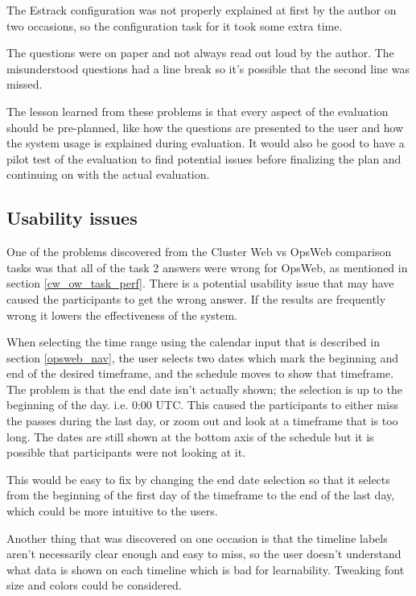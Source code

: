 The Estrack configuration was not properly explained at first by the author on two occasions, so the configuration task for it took some extra time.

The questions were on paper and not always read out loud by the author. The misunderstood questions had a line break so it's possible that the second line was missed. 

The lesson learned from these problems is that every aspect of the evaluation should be pre-planned, like how the questions are presented to the user and how the system usage is explained during evaluation. It would also be good to have a pilot test of the evaluation to find potential issues before finalizing the plan and continuing on with the actual evaluation.

\subsection{Usability issues} \label{usability_issues}
One of the problems discovered from the Cluster Web vs OpsWeb comparison tasks was that all of the task 2 answers were wrong for OpsWeb, as mentioned in section \ref{cw_ow_task_perf}. There is a potential usability issue that may have caused the participants to get the wrong answer. If the results are frequently wrong it lowers the effectiveness of the system.

When selecting the time range using the calendar input that is described in section \ref{opsweb_nav}, the user selects two dates which mark the beginning and end of the desired timeframe, and the schedule moves to show that timeframe. The problem is that the end date isn't actually shown; the selection is up to the beginning of the day. i.e. 0:00 UTC. This caused the participants to either miss the passes during the last day, or zoom out and look at a timeframe that is too long. The dates are still shown at the bottom axis of the schedule but it is possible that participants were not looking at it.

This would be easy to fix by changing the end date selection so that it selects from the beginning of the first day of the timeframe to the end of the last day, which could be more intuitive to the users.

Another thing that was discovered on one occasion is that the timeline labels aren't necessarily clear enough and easy to miss, so the user doesn't understand what data is shown on each timeline which is bad for learnability. Tweaking font size and colors could be considered.


